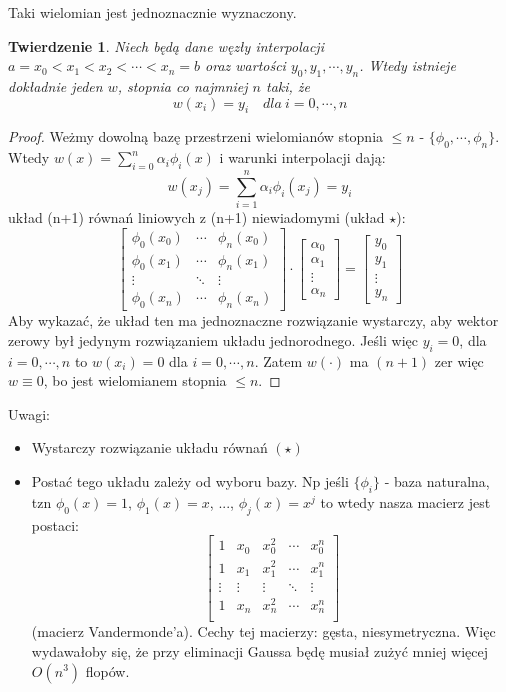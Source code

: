 \documentclass[hidelinks,a4paper,fleqn,oneside]{book}
\newtheorem{twierdz}{Twierdzenie}
\begin{document}
Taki wielomian jest jednoznacznie wyznaczony.
\begin{twierdz}
Niech będą dane węzły interpolacji $a = x_0 < x_1 < x_2 < \cdots < x_n = b$ oraz wartości $y_0, y_1, \cdots, y_n$. Wtedy istnieje dokładnie jeden $w$, stopnia co najmniej $n$ taki, że
\[
w(x_i) = y_i \quad dla\ i = 0, \cdots, n
\]
\end{twierdz}
\begin{proof}

Weżmy dowolną bazę przestrzeni wielomianów stopnia $\leq n$ - $\{\phi_0, \cdots, \phi_n\}$. Wtedy $w(x) = \sum_{i=0}^{n} \alpha_i \phi_i(x)$ i warunki interpolacji dają:
\[
w(x_j) = \sum\limits_{i=1}^{n} \alpha_i\phi_i(x_j) = y_i
\]
układ (n+1) równań liniowych z (n+1) niewiadomymi (układ $\star$):
\[
\left[
	\begin{array}{ccc}
		\phi_0(x_0) & \cdots & \phi_n(x_0) \\
		\phi_0(x_1) & \cdots & \phi_n(x_1) \\
		\vdots & \ddots & \vdots \\
		\phi_0(x_n) & \cdots & \phi_n(x_n)
	\end{array}
\right]
\cdot
\left[
	\begin{array}{c}
		\alpha_0 \\
		\alpha_1 \\
		\vdots \\
		\alpha_n

	\end{array}
\right]
=
\left[
	\begin{array}{c}
		y_0 \\
		y_1 \\
		\vdots \\
		y_n
	\end{array}
\right]
\]
Aby wykazać, że układ ten ma jednoznaczne rozwiązanie wystarczy, aby wektor zerowy był jedynym rozwiązaniem układu jednorodnego. Jeśli więc $y_i = 0$, dla $i = 0, \cdots, n$ to $w(x_i) = 0$ dla $i = 0, \cdots, n$. Zatem $w(\cdot)$ ma $(n+1)$ zer więc $w \equiv 0$, bo jest wielomianem stopnia $\leq n$.
\end{proof}

Uwagi:
\begin{itemize}
	\item Wystarczy rozwiązanie układu równań $(\star)$
	\item Postać tego układu zależy od wyboru bazy. Np jeśli $\{\phi_i\}$ - baza naturalna, tzn $\phi_0(x) = 1$, $\phi_1(x) = x$, ..., $\phi_j(x) = x^j$ to wtedy nasza macierz jest postaci:
\[
\left[
	\begin{array}{ccccc}
		1 & x_0 & x_0^2 & \cdots & x_0 ^ n \\
		1 & x_1 & x_1^2 & \cdots & x_1 ^ n \\
		\vdots & \vdots & \vdots & \ddots & \vdots \\
		1 & x_n & x_n^2 & \cdots & x_n ^ n \\
	\end{array}
\right]
\]
(macierz Vandermonde'a). Cechy tej macierzy: gęsta, niesymetryczna. Więc wydawałoby się, że przy eliminacji Gaussa będę musiał zużyć mniej więcej $O(n^3)$ flopów.
\end{itemize}
\end{document}
